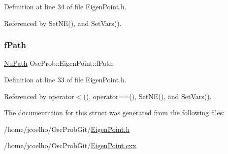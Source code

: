 Definition at line 34 of file Eigen\+Point.\+h.



Referenced by Set\+N\+E(), and Set\+Vars().

\mbox{\label{structOscProb_1_1EigenPoint_a1c263b6ceef5bd4de3181182f944efbb}} 
\subsubsection{\texorpdfstring{f\+Path}{fPath}}
{\footnotesize\ttfamily \hyperlink{structOscProb_1_1NuPath}{Nu\+Path} Osc\+Prob\+::\+Eigen\+Point\+::f\+Path}



Definition at line 33 of file Eigen\+Point.\+h.



Referenced by operator$<$(), operator==(), Set\+N\+E(), and Set\+Vars().



The documentation for this struct was generated from the following files\+:\begin{DoxyCompactItemize}
\item 
/home/jcoelho/\+Osc\+Prob\+Git/\hyperlink{EigenPoint_8h}{Eigen\+Point.\+h}\item 
/home/jcoelho/\+Osc\+Prob\+Git/\hyperlink{EigenPoint_8cxx}{Eigen\+Point.\+cxx}\end{DoxyCompactItemize}
